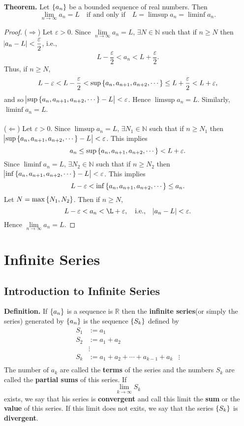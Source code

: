 \documentclass[12pt,a4paper]{article}
\newcommand{\dispsty}{\displaystyle}
\begin{document}
\begin{tcolorbox}[colback=white]
	\textbf{Theorem.} Let $\set{a_n}$ be a bounded sequence of real numbers. Then \[
	\lim\limits_{n\to\infty}a_n=L\quad \text{if and only if}\quad L=\limsup a_n = \liminf a_n.
	\]\tcblower\begin{proof}
		($\Rightarrow$) Let $\varepsilon>0$. Since $\lim\limits_{n\to\infty}a_n=L$, $\exists N\in\mathbb{N}$ such that if $n\geq N$ then $\abs{a_n-L}<\dispsty\frac{\varepsilon}{2}$, i.e., \[
		L-\frac{\varepsilon}{2}<a_n<L+\frac{\varepsilon}{2}.
		\] Thus, if $n\geq N$, \[
		L-\varepsilon<L-\frac{\varepsilon}{2}<\sup\set{a_n,a_{n+1},a_{n+2},\cdots}\leq L+\frac{\varepsilon}{2}<L+\varepsilon,
		\] and so $\abs{\sup\set{a_n,a_{n+1},a_{n+2},\cdots}-L}<\varepsilon$. Hence $\limsup a_n=L$. Similarly, $\liminf a_n=L$.\\
		\\
		($\Leftarrow$) Let $\varepsilon>0$. Since $\limsup a_n=L$, $\exists N_1\in\mathbb{N}$ such that if $n\geq N_1$ then $\abs{\sup\set{a_n,a_{n+1},a_{n+2},\cdots}-L}<\varepsilon$. This implies \[
		a_n\leq\sup\set{a_n,a_{n+1},a_{n+2},\cdots}<L+\varepsilon.
		\] Since $\liminf a_n=L$, $\exists N_2\in\mathbb{N}$ such that if $n\geq N_2$ then $\abs{\inf\set{a_n,a_{n+1},a_{n+2},\cdots}-L}<\varepsilon$. This implies \[
		L-\varepsilon<\inf\set{a_n,a_{n+1},a_{n+2},\cdots}\leq a_n.
		\] Let $N=\max\set{N_1,N_2}$. Then if $n\geq N$, \[
		L-\varepsilon<a_n<\L+\varepsilon,\quad \text{i.e.,}\quad \abs{a_n-L}<\varepsilon.
		\] Hence $\lim\limits_{n\to\infty}a_n=L$.
	\end{proof}
\end{tcolorbox}

\newpage
\section{Infinite Series}

\subsection{Introduction to Infinite Series}
\begin{tcolorbox}[colback=white]
	\textbf{Definition.} If $\set{a_n}$ is a sequence is $\mathbb{R}$ then the \textbf{infinite series}(or simply the series) generated by $\set{a_n}$ is the sequence $\set{S_k}$ defined by \begin{align*}
	S_1 &:= a_1 \\
	S_2 &:= a_1+a_2 \\
	&\vdots\\
	S_k&:=a_1+a_2+\cdots+a_{k-1}+a_k
	&\vdots\\
	\end{align*} The number of $a_k$ are called the \textbf{terms} of the series and the numbers $S_k$ are called the \textbf{partial sums} of this series. If \[
	\lim\limits_{k\to\infty}S_k
	\] exists, we say that his series is \textbf{convergent} and call this limit the \textbf{sum} or the \textbf{value} of this series. If this limit does not exits, we say that the series $\set{S_k}$ is \textbf{divergent}.
\end{tcolorbox}
\end{document}
